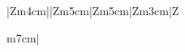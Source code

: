 \begin{landscape}
\begin{table}[htbp]
{\begin{tabular}{|Z{\centering}{m}{4cm}||Z{\centering}{m}{5cm}|Z{\centering}{m}{5cm}|Z{\centering}{m}{3cm}|Z{\raggedright}{m}{7cm}|}
 
   \end{tabular}}%
  \label{tab:mve2}%
\end{table}%
\end{landscape}